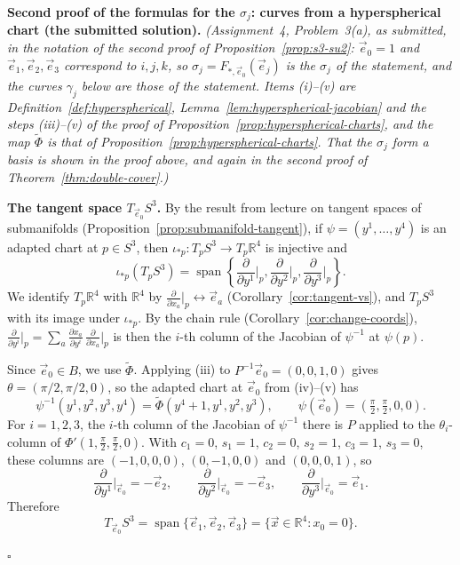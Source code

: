 \documentclass[11pt]{report}
\renewenvironment{proof}[1][Proof]{\noindent\textbf{#1.} }{\hfill$\square$\par\vspace{5pt}}
\begin{document}
\begin{proof}[Second proof of the formulas for the $\sigma_j$: curves from a hyperspherical chart (the submitted solution)]
\textit{(Assignment~4, Problem~3(a), as submitted, in the notation of the second proof of Proposition~\ref{prop:s3-su2}: $\vec e_0 = 1$ and $\vec e_1, \vec e_2, \vec e_3$ correspond to $i, j, k$, so $\sigma_j = F_{*,\vec e_0}(\vec e_j)$ is the $\sigma_j$ of the statement, and the curves $\gamma_j$ below are those of the statement. Items (i)--(v) are Definition~\ref{def:hyperspherical}, Lemma~\ref{lem:hyperspherical-jacobian} and the steps (iii)--(v) of the proof of Proposition~\ref{prop:hyperspherical-charts}, and the map $\tilde\Phi$ is that of Proposition~\ref{prop:hyperspherical-charts}. That the $\sigma_j$ form a basis is shown in the proof above, and again in the second proof of Theorem~\ref{thm:double-cover}.)}

\textbf{The tangent space $T_{\vec e_0} S^3$.} By the result from lecture on tangent spaces of submanifolds (Proposition~\ref{prop:submanifold-tangent}), if $\psi = (y^1, \ldots, y^4)$ is an adapted chart at $p \in S^3$, then $\iota_{*p} : T_p S^3 \to T_p\mathbb{R}^4$ is injective and
\[
\iota_{*p}(T_p S^3) = \operatorname{span}\left\{ \frac{\partial}{\partial y^1}\Big|_p, \frac{\partial}{\partial y^2}\Big|_p, \frac{\partial}{\partial y^3}\Big|_p \right\}.
\]
We identify $T_p\mathbb{R}^4$ with $\mathbb{R}^4$ by $\frac{\partial}{\partial x_a}\big|_p \leftrightarrow \vec e_a$ (Corollary~\ref{cor:tangent-vs}), and $T_p S^3$ with its image under $\iota_{*p}$. By the chain rule (Corollary~\ref{cor:change-coords}), $\frac{\partial}{\partial y^i}\big|_p = \sum_a \frac{\partial x_a}{\partial y^i}\,\frac{\partial}{\partial x_a}\big|_p$ is then the $i$-th column of the Jacobian of $\psi^{-1}$ at $\psi(p)$.

Since $\vec e_0 \in B$, we use $\tilde\Phi$. Applying (iii) to $P^{-1}\vec e_0 = (0, 0, 1, 0)$ gives $\theta = (\pi/2, \pi/2, 0)$, so the adapted chart at $\vec e_0$ from (iv)--(v) has
\[
\psi^{-1}(y^1, y^2, y^3, y^4) = \tilde\Phi(y^4 + 1, y^1, y^2, y^3), \qquad \psi(\vec e_0) = (\tfrac{\pi}{2}, \tfrac{\pi}{2}, 0, 0).
\]
For $i = 1, 2, 3$, the $i$-th column of the Jacobian of $\psi^{-1}$ there is $P$ applied to the $\theta_i$-column of $\Phi'(1, \frac{\pi}{2}, \frac{\pi}{2}, 0)$. With $c_1 = 0$, $s_1 = 1$, $c_2 = 0$, $s_2 = 1$, $c_3 = 1$, $s_3 = 0$, these columns are $(-1, 0, 0, 0)$, $(0, -1, 0, 0)$ and $(0, 0, 0, 1)$, so
\[
\frac{\partial}{\partial y^1}\Big|_{\vec e_0} = -\vec e_2, \qquad \frac{\partial}{\partial y^2}\Big|_{\vec e_0} = -\vec e_3, \qquad \frac{\partial}{\partial y^3}\Big|_{\vec e_0} = \vec e_1 .
\]
Therefore
\[
T_{\vec e_0} S^3 = \operatorname{span}\{ \vec e_1, \vec e_2, \vec e_3 \} = \{ \vec x \in \mathbb{R}^4 : x_0 = 0 \}.
\]


\end{proof}
\end{document}
